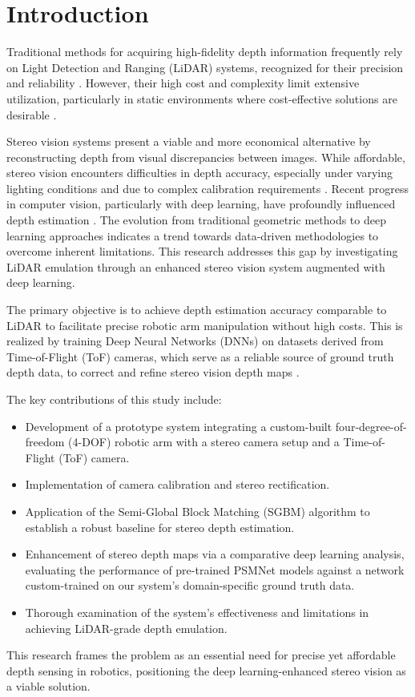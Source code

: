 \documentclass[conference]{IEEEtran}
\begin{document}
\section{Introduction}
 Traditional methods for acquiring high-fidelity depth information frequently rely on Light Detection and Ranging (LiDAR) systems, recognized for their precision and reliability \cite{wang2023multi}. However, their high cost and complexity limit extensive utilization, particularly in static environments where cost-effective solutions are desirable \cite{son2019lightweight}.

Stereo vision systems present a viable and more economical alternative by reconstructing depth from visual discrepancies between images. While affordable, stereo vision encounters difficulties in depth accuracy, especially under varying lighting conditions and due to complex calibration requirements \cite{zhou2006high}. Recent progress in computer vision, particularly with deep learning, have profoundly influenced depth estimation \cite{xu2025towards}. The evolution from traditional geometric methods to deep learning approaches \cite{rohan2025systematic} indicates a trend towards data-driven methodologies to overcome inherent limitations. This research addresses this gap by investigating LiDAR emulation through an enhanced stereo vision system augmented with deep learning.

The primary objective is to achieve depth estimation accuracy comparable to LiDAR to facilitate precise robotic arm manipulation without high costs. This is realized by training Deep Neural Networks (DNNs) on datasets derived from Time-of-Flight (ToF) cameras, which serve as a reliable source of ground truth depth data, to correct and refine stereo vision depth maps \cite{agresti2019stereo}.

The key contributions of this study include:
\begin{itemize}
    \item Development of a prototype system integrating a custom-built four-degree-of-freedom (4-DOF) robotic arm with a stereo camera setup and a Time-of-Flight (ToF) camera.
    \item Implementation of camera calibration and stereo rectification.
    \item Application of the Semi-Global Block Matching (SGBM) algorithm to establish a robust baseline for stereo depth estimation.
    \item Enhancement of stereo depth maps via a comparative deep learning analysis, evaluating the performance of pre-trained PSMNet models against a network custom-trained on our system's domain-specific ground truth data.
    \item Thorough examination of the system's effectiveness and limitations in achieving LiDAR-grade depth emulation.
\end{itemize}
This research frames the problem as an essential need for precise yet affordable depth sensing in robotics, positioning the deep learning-enhanced stereo vision as a viable solution.
\end{document}
